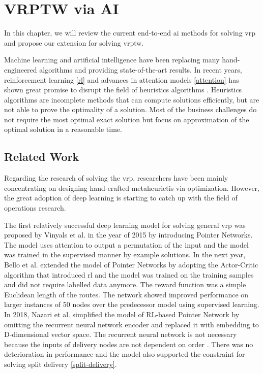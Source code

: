 \chapter{VRPTW via AI}
In this chapter, we will review the current end-to-end \gls{ai} methods for solving \gls{vrp} and propose our extension for solving \gls{vrptw}.

Machine learning and artificial intelligence have been replacing many hand-engineered algorithms and providing state-of-the-art results. In recent years, reinforcement learning \ref{rl} and advances in attention models \ref{attention} has shown great promise to disrupt the field of heuristics algorithms \cite{rl-constraint-opt, attention-route, dpdp}. Heuristics algorithms \cite{heuristics-algo} are incomplete methods that can compute solutions efficiently, but are not able to prove the optimality of a solution. Most of the business challenges do not require the most optimal exact solution \cite{excat-algo} but focus on approximation of the optimal solution in a reasonable time.

\section{Related Work}
Regarding the research of solving the \gls{vrp}, researchers have been mainly concentrating on designing hand-crafted metaheurictis via optimization. However, the great adoption of deep learning is starting to catch up with the field of operations research.

The first relatively successful deep learning model for solving general \gls{vrp} was proposed by Vinyals et al. \cite{vinyals} in the year of 2015 by introducing Pointer Networks. The model uses attention to output
a permutation of the input and the model was trained in the supervised manner by example solutions. In the next year, Bello et al. \cite{actor-critic-pointer} extended the model of Pointer Networks by adopting the Actor-Critic algorithm that introduced \gls{rl} and the model was trained on the training samples and did not require labelled data anymore. The reward function was a simple Euclidean length of the routes. The network showed improved performance on larger instances of 50 nodes over the predecessor model using supervised learning. In 2018, Nazari et al. \cite{nazari} simplified the model of RL-based Pointer Network by omitting the recurrent neural network encoder and replaced it with embedding to D-dimensional vector space. The recurrent neural network is not necessary because the inputs of delivery nodes are not dependent on order \cite{nazari}. There was no deterioration in performance and the model also supported the constraint for solving split delivery \ref{split-delivery}.

